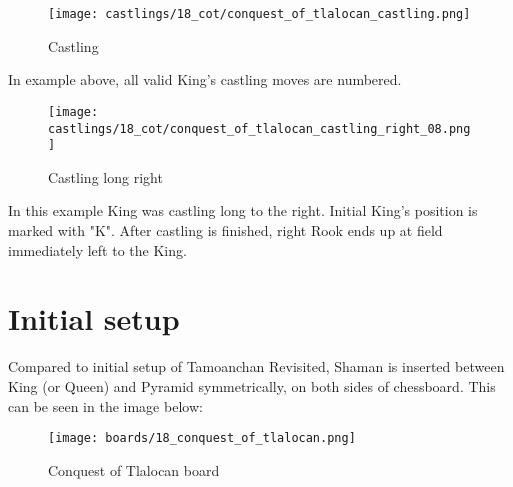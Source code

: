 \noindent
\begin{figure}[!h]
\texttt{[image: castlings/18\_cot/conquest\_of\_tlalocan\_castling.png]}
\caption{Castling}
\label{fig:conquest_of_tlalocan_castling}
\end{figure}

In example above, all valid King's castling moves are numbered.

\noindent
\begin{figure}[!h]
\texttt{[image: castlings/18\_cot/conquest\_of\_tlalocan\_castling\_right\_08.png]}
\caption{Castling long right}
\label{fig:conquest_of_tlalocan_castling_right_08}
\end{figure}

In this example King was castling long to the right. Initial King's position
is marked with "K". After castling is finished, right Rook ends up at field
immediately left to the King.

\clearpage %

\section*{Initial setup}
\label{sec:Conquest of Tlalocan/Initial setup}

Compared to initial setup of Tamoanchan Revisited, Shaman is inserted between
King (or Queen) and Pyramid symmetrically, on both sides of chessboard. This
can be seen in the image below:

\noindent
\begin{figure}[h]
\texttt{[image: boards/18\_conquest\_of\_tlalocan.png]}
\caption{Conquest of Tlalocan board}
\label{fig:18_conquest_of_tlalocan}
\end{figure}

\clearpage %
